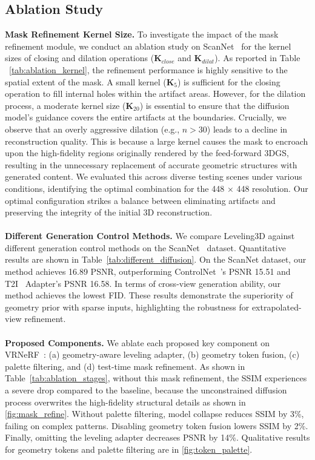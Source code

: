 \subsection{Ablation Study}
\noindent\textbf{Mask Refinement Kernel Size.} To investigate the impact of the mask refinement module, we conduct an ablation study on ScanNet~\cite{dai2017scannet} for the kernel sizes of closing and dilation operations ($\mathbf{K}_{close}$ and $\mathbf{K}_{dilat}$). As reported in Table ~\ref{tab:ablation_kernel}, the refinement performance is highly sensitive to the spatial extent of the mask. A small kernel ($\mathbf{K}_5$) is sufficient for the closing operation to fill internal holes within the artifact areas. However, for the dilation process, a moderate kernel size ($\mathbf{K}_{20}$) is essential to ensure that the diffusion model's guidance covers the entire artifacts at the boundaries. Crucially, we observe that an overly aggressive dilation  (e.g., $n > 30$) leads to a decline in reconstruction quality. This is because a large kernel causes the mask to encroach upon the high-fidelity regions originally rendered by the feed-forward 3DGS, resulting in the unnecessary replacement of accurate geometric structures with generated content. We evaluated this across diverse testing scenes under various conditions, identifying the optimal combination for the 448 × 448 resolution. Our optimal configuration strikes a balance between eliminating artifacts and preserving the integrity of the initial 3D reconstruction.
\\
\\
\noindent\textbf{Different Generation Control Methods.} We compare Leveling3D against different generation control methods on the ScanNet~\cite{dai2017scannet} dataset. Quantitative results are shown in Table~\ref{tab:different_diffusion}. On the ScanNet dataset, our method achieves 16.89 PSNR, outperforming ControlNet~\cite{zhang2023ControlNet}'s PSNR 15.51 and T2I~\cite{mou2024t2i} Adapter's PSNR 16.58. In terms of cross-view generation ability, our method achieves the lowest FID. These results demonstrate the superiority of geometry prior with sparse inputs, highlighting the robustness for extrapolated-view refinement.
\\
\\
\noindent\textbf{Proposed Components.} We ablate each proposed key component on VRNeRF~\cite{xu2023vr}: (a) geometry-aware leveling adapter, (b) geometry token fusion, (c) palette filtering, and (d) test-time mask refinement. As shown in Table~\ref{tab:ablation_stages}, without this mask refinement, the SSIM experiences a severe drop compared to the baseline, because the unconstrained diffusion process overwrites the high-fidelity structural details as shown in \cref{fig:mask_refine}. Without palette filtering, model collapse reduces SSIM by 3\%, failing on complex patterns. Disabling geometry token fusion lowers SSIM by 2\%. Finally, omitting the leveling adapter decreases PSNR by 14\%.
Qualitative results for geometry tokens and palette filtering are in \cref{fig:token_palette}.


% 
% 



